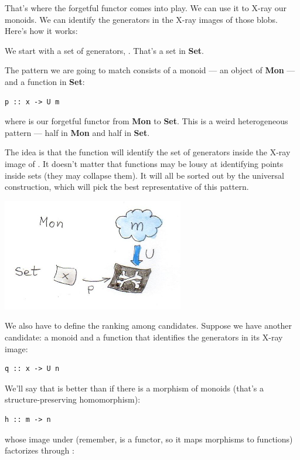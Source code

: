 That's where the forgetful functor comes into play. We can use it to
X-ray our monoids. We can identify the generators in the X-ray images of
those blobs. Here's how it works:

We start with a set of generators, . That's a set in
\textbf{Set}.

The pattern we are going to match consists of a monoid  --- an
object of \textbf{Mon} --- and a function  in \textbf{Set}:

\begin{verbatim}
p :: x -> U m
\end{verbatim}

where  is our forgetful functor from \textbf{Mon} to
\textbf{Set}. This is a weird heterogeneous pattern --- half in
\textbf{Mon} and half in \textbf{Set}.

The idea is that the function  will identify the set of
generators inside the X-ray image of . It doesn't matter that
functions may be lousy at identifying points inside sets (they may
collapse them). It will all be sorted out by the universal construction,
which will pick the best representative of this pattern.

\includegraphics[width=3.12500in]{images/monoid-pattern.jpg}

We also have to define the ranking among candidates. Suppose we have
another candidate: a monoid  and a function that identifies
the generators in its X-ray image:

\begin{verbatim}
q :: x -> U n
\end{verbatim}

We'll say that  is better than  if there is a
morphism of monoids (that's a structure-preserving homomorphism):

\begin{verbatim}
h :: m -> n
\end{verbatim}

whose image under  (remember,  is a functor, so it
maps morphisms to functions) factorizes through :


